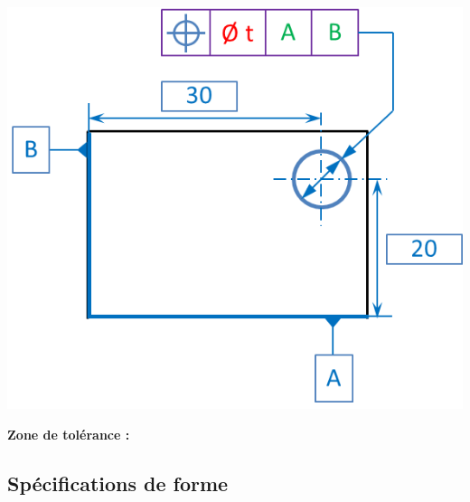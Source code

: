 \documentclass[11pt,oneside]{article}
\begin{document}
\begin{exemple}
\begin{minipage}[t]{.3\linewidth}
\begin{center}
$\;$

\includegraphics[width=.95\textwidth]{png/zt_2}
\end{center}
\end{minipage} \hfill
\begin{minipage}[t]{.3\linewidth}
\textbf{Zone de tolérance :}

\end{minipage} \hfill
\begin{minipage}[t]{.3\linewidth}
\begin{center}
\end{center}
\end{minipage} 
\end{exemple}

\newpage

\subsection{Spécifications de forme}
\end{document}
